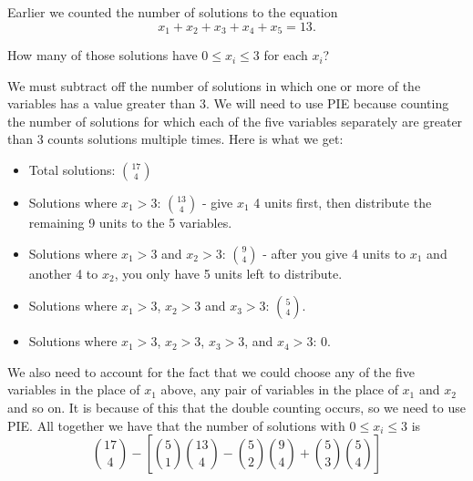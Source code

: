 \documentclass[12pt]{article}
\begin{document}
\begin{example}
Earlier we counted the number of solutions to the equation
\[x_1 + x_2 + x_3 + x_4 + x_5 = 13.\]

How many of those solutions have $0 \le x_i \le 3$ for each $x_i$? 


\begin{solution}
 We must subtract off the number of solutions in which one or more of the variables has a value greater than 3.  We will need to use PIE because counting the number of solutions for which each of the five variables separately are greater than 3 counts solutions multiple times.  Here is what we get:
    \begin{itemize}
      \item Total solutions: ${17 \choose 4}$
      \item Solutions where $x_1 > 3$: ${13 \choose 4}$ - give $x_1$ 4 units first, then distribute the remaining 9 units to the 5 variables.
      \item Solutions where $x_1 > 3$ and $x_2 > 3$: ${9 \choose 4}$ - after you give 4 units to $x_1$ and another 4 to $x_2$, you only have 5 units left to distribute.
      \item Solutions where $x_1 > 3$, $x_2 > 3$ and $x_3 > 3$: ${5 \choose 4}$.
      \item Solutions where $x_1 > 3$, $x_2 > 3$, $x_3 > 3$, and $x_4 > 3$: 0.
    \end{itemize}
    We also need to account for the fact that we could choose any of the five variables in the place of $x_1$ above, any pair of variables in the place of $x_1$ and $x_2$ and so on.  It is because of this that the double counting occurs, so we need to use PIE.  All together we have that the number of solutions with $0 \le x_i \le 3$ is
    \[{17 \choose 4} - \left[{5\choose 1}{13 \choose 4} - {5 \choose 2}{9 \choose 4} + {5 \choose 3}{5 \choose 4}\right]\]
  \end{solution}
\end{example}




\end{document}
